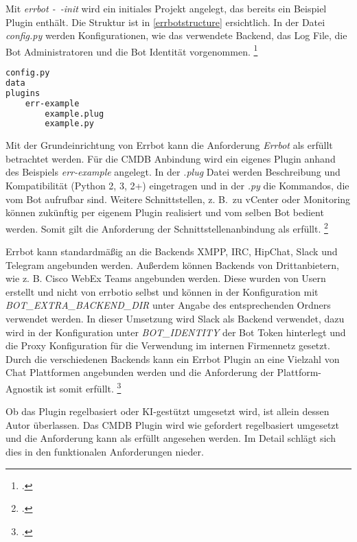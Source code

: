 Mit \textit{errbot -~-init} wird ein initiales Projekt angelegt, das bereits ein Beispiel Plugin enthält. Die Struktur ist in \autoref{errbotstructure} ersichtlich. In der Datei \textit{config.py} werden Konfigurationen, wie das verwendete Backend, das Log File, die Bot Administratoren und die Bot Identität vorgenommen.
\footcite[Vgl.][o. \pno]{errbot_2018_setup}

\begin{lstlisting}[language=bash, label=errbotstructure, caption=Struktur eines Errbot Projektes]
config.py
data
plugins
    err-example
        example.plug
        example.py
\end{lstlisting}

Mit der Grundeinrichtung von Errbot kann die Anforderung \textit{Errbot} als erfüllt betrachtet werden. Für die \acs{CMDB} Anbindung wird ein eigenes Plugin anhand des Beispiels \textit{err-example} angelegt. In der \textit{.plug} Datei werden Beschreibung und Kompatibilität (Python 2, 3, 2+) eingetragen und in der \textit{.py} die Kommandos, die vom Bot aufrufbar sind. Weitere Schnittstellen, z. B.~zu vCenter oder Monitoring können zukünftig per eigenem Plugin realisiert und vom selben Bot bedient werden. Somit gilt die Anforderung der Schnittstellenanbindung als erfüllt. 
\footcite[Vgl.][o. \pno]{errbot_2018_plugin}


Errbot kann standardmäßig an die Backends XMPP, IRC, HipChat, Slack und Telegram angebunden werden. Außerdem können Backends von Drittanbietern, wie z. B. Cisco WebEx Teams angebunden werden. Diese wurden von Usern erstellt und nicht von errbotio selbst und können in der Konfiguration mit \textit{BOT\_EXTRA\_BACKEND\_DIR} unter Angabe des entsprechenden Ordners verwendet werden. In dieser Umsetzung wird Slack als Backend verwendet, dazu wird in der Konfiguration unter \textit{BOT\_IDENTITY} der Bot Token hinterlegt und die Proxy Konfiguration für die Verwendung im internen Firmennetz gesetzt. Durch die verschiedenen Backends kann ein Errbot Plugin an eine Vielzahl von Chat Plattformen angebunden werden und die Anforderung der Plattform-Agnostik ist somit erfüllt.
\footcites[Vgl.][o. \pno]{errbot_2018_setup}[Vgl.][o. \pno]{errbot_2018_webex}

Ob das Plugin regelbasiert oder KI-gestützt umgesetzt wird, ist allein dessen Autor überlassen. Das \acs{CMDB} Plugin wird wie gefordert regelbasiert umgesetzt und die Anforderung kann als erfüllt angesehen werden. Im Detail schlägt sich dies in den funktionalen Anforderungen nieder.


